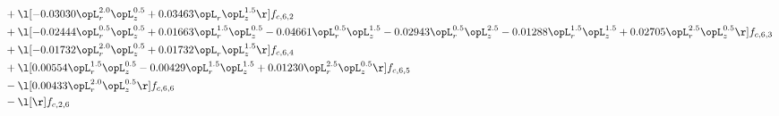\begin{alignat}{2}
& + \l[  -0.03030 \opL_r^{2.0} \opL_z^{0.5} +  0.03463 \opL_r \opL_z^{1.5}  \r] f_{c,6,2} \nonumber \\ 
& + \l[  -0.02444 \opL_r^{0.5} \opL_z^{0.5} +  0.01663 \opL_r^{1.5} \opL_z^{0.5}   -0.04661 \opL_r^{0.5} \opL_z^{1.5}   -0.02943 \opL_r^{0.5} \opL_z^{2.5}   -0.01288 \opL_r^{1.5} \opL_z^{1.5} +  0.02705 \opL_r^{2.5} \opL_z^{0.5}  \r] f_{c,6,3} \nonumber \\ 
& + \l[  -0.01732 \opL_r^{2.0} \opL_z^{0.5} +  0.01732 \opL_r \opL_z^{1.5}  \r] f_{c,6,4} \nonumber \\ 
& + \l[  0.00554 \opL_r^{1.5} \opL_z^{0.5}   -0.00429 \opL_r^{1.5} \opL_z^{1.5} +  0.01230 \opL_r^{2.5} \opL_z^{0.5}  \r] f_{c,6,5} \nonumber \\ 
& - \l[  0.00433 \opL_r^{2.0} \opL_z^{0.5}  \r] f_{c,6,6} \nonumber \\ 
& - \l[  \r] f_{c,2,6} \nonumber \\ 
\end{alignat} 


